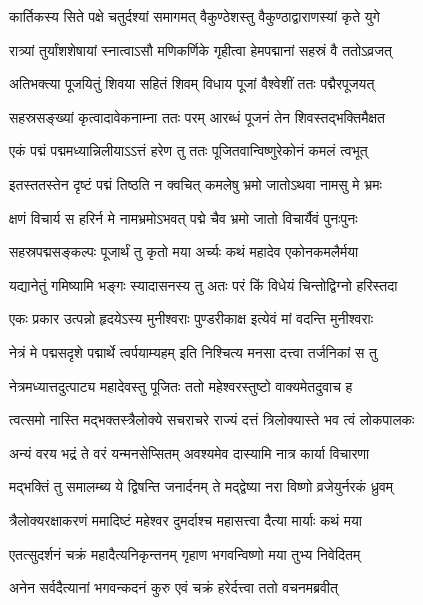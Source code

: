 \twolineshloka
{कार्तिकस्य सिते पक्षे चतुर्दश्यां समागमत्}
{वैकुण्ठेशस्तु वैकुण्ठाद्वाराणस्यां कृते युगे} %

\twolineshloka
{रात्र्यां तुर्यांशशेषायां स्नात्वाऽसौ मणिकर्णिके}
{गृहीत्वा हेमपद्मानां सहस्रं वै ततोऽव्रजत्} %

\twolineshloka
{अतिभक्त्या पूजयितुं शिवया सहितं शिवम्}
{विधाय पूजां वैश्वेशीं ततः पद्मैरपूजयत्} %

\twolineshloka
{सहस्रसङ्ख्यां कृत्वादावेकनाम्ना ततः परम्}
{आरब्धं पूजनं तेन शिवस्तद्भक्तिमैक्षत} %

\twolineshloka
{एकं पद्मं पद्ममध्यान्निलीयाऽऽत्तं हरेण तु}
{ततः पूजितवान्विष्णुरेकोनं कमलं त्वभूत्} %

\twolineshloka
{इतस्ततस्तेन दृष्टं पद्मं तिष्ठति न क्वचित्}
{कमलेषु भ्रमो जातोऽथवा नामसु मे भ्रमः} %

\twolineshloka
{क्षणं विचार्य स हरिर्न मे नामभ्रमोऽभवत्}
{पद्मे चैव भ्रमो जातो विचार्यैवं पुनःपुनः} %

\twolineshloka
{सहस्रपद्मसङ्कल्पः पूजार्थं तु कृतो मया}
{अर्च्यः कथं महादेव एकोनकमलैर्मया} %

\twolineshloka
{यद्यानेतुं गमिष्यामि भङ्गः स्यादासनस्य तु}
{अतः परं किं विधेयं चिन्तोद्विग्नो हरिस्तदा} %

\twolineshloka
{एकः प्रकार उत्पन्नो हृदयेऽस्य मुनीश्वराः}
{पुण्डरीकाक्ष इत्येवं मां वदन्ति मुनीश्वराः} %

\twolineshloka
{नेत्रं मे पद्मसदृशे पद्मार्थे त्वर्पयाम्यहम्}
{इति निश्चित्य मनसा दत्त्वा तर्जनिकां स तु} %

\twolineshloka
{नेत्रमध्यात्तदुत्पाट्य महादेवस्तु पूजितः}
{ततो महेश्वरस्तुष्टो वाक्यमेतदुवाच ह} %


\twolineshloka
{त्वत्समो नास्ति मद्भक्तस्त्रैलोक्ये सचराचरे}
{राज्यं दत्तं त्रिलोक्यास्ते भव त्वं लोकपालकः} %

\twolineshloka
{अन्यं वरय भद्रं ते वरं यन्मनसेप्सितम्}
{अवश्यमेव दास्यामि नात्र कार्या विचारणा} %

\twolineshloka
{मद्भक्तिं तु समालम्ब्य ये द्विषन्ति जनार्दनम्}
{ते मद्द्वेष्या नरा विष्णो व्रजेयुर्नरकं ध्रुवम्} %


\twolineshloka
{त्रैलोक्यरक्षाकरणं ममादिष्टं महेश्वर}
{दुमर्दाश्च महासत्त्वा दैत्या मार्याः कथं मया} %

\twolineshloka
{एतत्सुदर्शनं चक्रं महादैत्यनिकृन्तनम्}
{गृहाण भगवन्विष्णो मया तुभ्य निवेदितम्} %

\twolineshloka
{अनेन सर्वदैत्यानां भगवन्कदनं कुरु}
{एवं चक्रं हरेर्दत्त्वा ततो वचनमब्रवीत्} %


